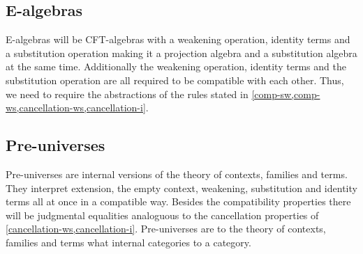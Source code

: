\subsection{E-algebras}
E-algebras will be CFT-algebras with a weakening operation, identity terms and
a substitution operation making it a projection algebra and a substitution 
algebra at the same time. Additionally the weakening operation, identity terms
and the substitution operation are all required to be compatible with each
other. Thus, we need to require the abstractions of the rules stated in
\autoref{comp-sw,comp-ws,cancellation-ws,cancellation-i}.

\subsection{Pre-universes}
Pre-universes are internal versions of the theory of contexts, families and
terms. They interpret extension, the empty context, weakening, substitution
and identity terms all at once in a compatible way. Besides the compatibility
properties there will be judgmental equalities analoguous to the cancellation
properties of \autoref{cancellation-ws,cancellation-i}. Pre-universes are to
the theory of contexts, families and terms what internal categories to a
category.
